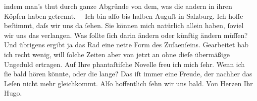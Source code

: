\begin{ledgroupsized}[t]{13cm}
               indem man’s thut durch ganze Abgründe von dem, was die andern in ihren Köpfen haben
               getrennt. – Ich bin alſo bis {\pb}halben Auguſt in Salzburg. Ich
               hoffe beſtimmt, daſs wir uns da ſehen. Sie können mich natürlich allein haben, ſoviel
               wir uns das verlangen. Was ſollte ſich darin ändern oder künftig ändern müſſen? Und
               übrigens ergibt ja das Rad eine nette Form des Zuſa{\geminationm}enſeins.\pend
           \pstart
           Gearbeitet hab ich recht {\pb}wenig,
               will ſolche Zeiten aber von je\introOben{}t\introOben{}zt an ohne dieſe übermäßige
               Ungeduld ertragen. Auf Ihre phantaſtiſche Novelle freu ich mich ſehr. Wenn ich ſie bald hören könnte,
               oder die lange? Das iſt immer
               eine Freude, der nachher das Leſen nicht mehr gleichkommt.\pend
           \pstart Alſo hoffentlich ſehn wir uns bald. Von Herzen Ihr \spacefill\mbox{Hugo.}\pend{}
         
         \endnumbering{}\end{ledgroupsized}  \newcommand{\dateiname}{L01061}\newcommand{\titel}{Hugo von Hofmannsthal an Arthur Schnitzler, 27. 7. 1900}\newcommand{\editorInnen}{Martin Anton Müller und Gerd-Hermann Susen}
      